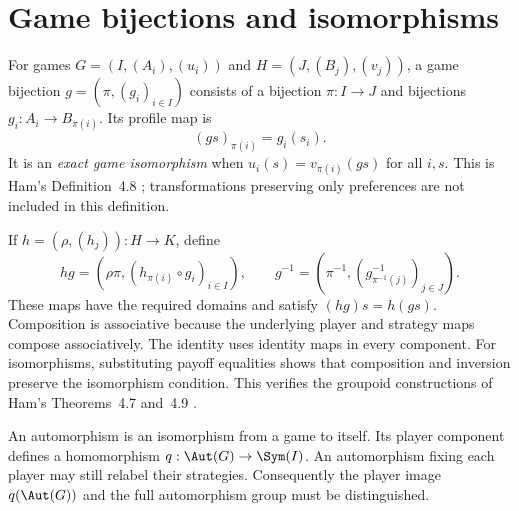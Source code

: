\section{Game bijections and isomorphisms}
For games $G=(I,(A_i),(u_i))$ and $H=(J,(B_j),(v_j))$, a game bijection
$g=(\pi,(g_i)_{i\in I})$ consists of a bijection $\pi:I\to J$ and
bijections $g_i:A_i\to B_{\pi(i)}$. Its profile map is
\[
 (gs)_{\pi(i)}=g_i(s_i).
\]
It is an \emph{exact game isomorphism} when
$u_i(s)=v_{\pi(i)}(gs)$ for all $i,s$.
This is Ham's Definition~4.8 \citep{ham2021}; transformations preserving
only preferences are not included in this definition.

If $h=(\rho,(h_j)):H\to K$, define
\[
 hg=(\rho\pi,(h_{\pi(i)}\circ g_i)_{i\in I}),\qquad
 g^{-1}=(\pi^{-1},(g_{\pi^{-1}(j)}^{-1})_{j\in J}).
\]
These maps have the required domains and satisfy $(hg)s=h(gs)$.
Composition is associative because the underlying player and strategy maps
compose associatively. The identity uses identity maps in every component.
For isomorphisms, substituting payoff equalities shows that composition and
inversion preserve the isomorphism condition. This verifies the groupoid
constructions of Ham's Theorems~4.7 and~4.9 \citep{ham2021}.

An automorphism is an isomorphism from a game to itself. Its player component
defines a homomorphism $q:\Aut(G)\to\Sym(I)$. An automorphism fixing each
player may still relabel their strategies. Consequently the player image
$q(\Aut(G))$ and the full automorphism group must be distinguished.
